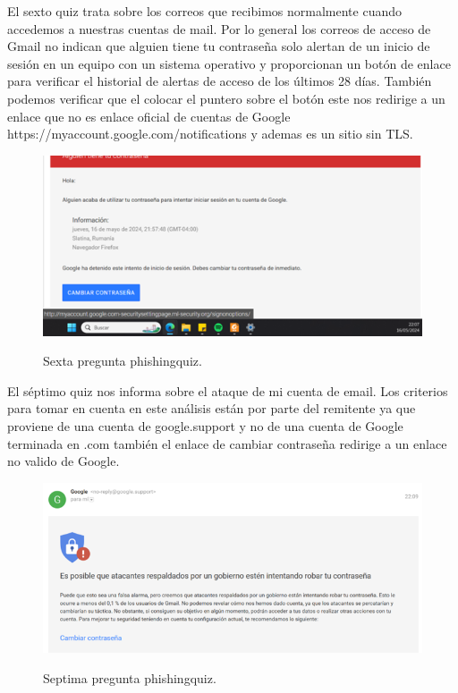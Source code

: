 \documentclass[stu, 11pt, letterpaper, donotrepeattitle, floatsintext, natbib]{apa7}
\begin{document}
El sexto quiz trata sobre los correos que recibimos normalmente cuando accedemos a nuestras cuentas de mail. Por lo general los correos de acceso de Gmail no indican que alguien tiene tu contraseña solo alertan de un inicio de sesión en un equipo con un sistema operativo y proporcionan un botón de enlace para verificar el historial de alertas de acceso de los últimos 28 días. También podemos verificar que el colocar el puntero sobre el botón este nos redirige a un enlace que no es enlace oficial de cuentas de Google https://myaccount.google.com/notifications  y ademas es un sitio sin TLS.

\begin{figure}[H]
    \centering
    \caption{Sexta pregunta phishingquiz.}
    \includegraphics[width=0.75\linewidth]{phishing9.png} %
    \label{fig:OverallEffect}
\end{figure}

El séptimo quiz nos informa sobre el ataque de mi cuenta de email. Los criterios para tomar en cuenta en este análisis están por parte del remitente ya que proviene de una cuenta de google.support  y no de una cuenta de Google terminada en .com también el enlace de cambiar contraseña redirige a un enlace no valido de Google.

\begin{figure}[H]
    \centering
    \caption{Septima pregunta phishingquiz.}
    \includegraphics[width=0.75\linewidth]{phishing10.png} %
    \label{fig:OverallEffect}
\end{figure}
\end{document}
